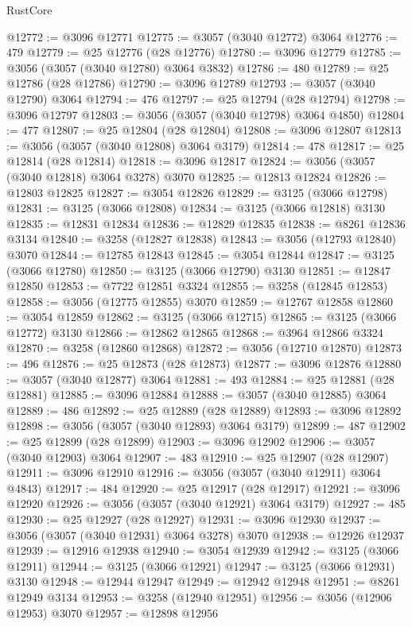 \begin{lexlean}{RustCore}
\begin{coremodule}
@12772 := @3096 @12771
@12775 := @3057 (@3040 @12772) @3064
@12776 := 479
@12779 := @25 @12776 (@28 @12776)
@12780 := @3096 @12779
@12785 := @3056 (@3057 (@3040 @12780) @3064 @3832)
@12786 := 480
@12789 := @25 @12786 (@28 @12786)
@12790 := @3096 @12789
@12793 := @3057 (@3040 @12790) @3064
@12794 := 476
@12797 := @25 @12794 (@28 @12794)
@12798 := @3096 @12797
@12803 := @3056 (@3057 (@3040 @12798) @3064 @4850)
@12804 := 477
@12807 := @25 @12804 (@28 @12804)
@12808 := @3096 @12807
@12813 := @3056 (@3057 (@3040 @12808) @3064 @3179)
@12814 := 478
@12817 := @25 @12814 (@28 @12814)
@12818 := @3096 @12817
@12824 := @3056 (@3057 (@3040 @12818) @3064 @3278) @3070
@12825 := @12813 @12824
@12826 := @12803 @12825
@12827 := @3054 @12826
@12829 := @3125 (@3066 @12798)
@12831 := @3125 (@3066 @12808)
@12834 := @3125 (@3066 @12818) @3130
@12835 := @12831 @12834
@12836 := @12829 @12835
@12838 := @8261 @12836 @3134
@12840 := @3258 (@12827 @12838)
@12843 := @3056 (@12793 @12840) @3070
@12844 := @12785 @12843
@12845 := @3054 @12844
@12847 := @3125 (@3066 @12780)
@12850 := @3125 (@3066 @12790) @3130
@12851 := @12847 @12850
@12853 := @7722 @12851 @3324
@12855 := @3258 (@12845 @12853)
@12858 := @3056 (@12775 @12855) @3070
@12859 := @12767 @12858
@12860 := @3054 @12859
@12862 := @3125 (@3066 @12715)
@12865 := @3125 (@3066 @12772) @3130
@12866 := @12862 @12865
@12868 := @3964 @12866 @3324
@12870 := @3258 (@12860 @12868)
@12872 := @3056 (@12710 @12870)
@12873 := 496
@12876 := @25 @12873 (@28 @12873)
@12877 := @3096 @12876
@12880 := @3057 (@3040 @12877) @3064
@12881 := 493
@12884 := @25 @12881 (@28 @12881)
@12885 := @3096 @12884
@12888 := @3057 (@3040 @12885) @3064
@12889 := 486
@12892 := @25 @12889 (@28 @12889)
@12893 := @3096 @12892
@12898 := @3056 (@3057 (@3040 @12893) @3064 @3179)
@12899 := 487
@12902 := @25 @12899 (@28 @12899)
@12903 := @3096 @12902
@12906 := @3057 (@3040 @12903) @3064
@12907 := 483
@12910 := @25 @12907 (@28 @12907)
@12911 := @3096 @12910
@12916 := @3056 (@3057 (@3040 @12911) @3064 @4843)
@12917 := 484
@12920 := @25 @12917 (@28 @12917)
@12921 := @3096 @12920
@12926 := @3056 (@3057 (@3040 @12921) @3064 @3179)
@12927 := 485
@12930 := @25 @12927 (@28 @12927)
@12931 := @3096 @12930
@12937 := @3056 (@3057 (@3040 @12931) @3064 @3278) @3070
@12938 := @12926 @12937
@12939 := @12916 @12938
@12940 := @3054 @12939
@12942 := @3125 (@3066 @12911)
@12944 := @3125 (@3066 @12921)
@12947 := @3125 (@3066 @12931) @3130
@12948 := @12944 @12947
@12949 := @12942 @12948
@12951 := @8261 @12949 @3134
@12953 := @3258 (@12940 @12951)
@12956 := @3056 (@12906 @12953) @3070
@12957 := @12898 @12956

\end{coremodule}
\end{lexlean}
